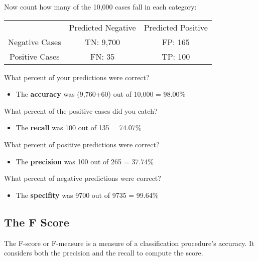 \documentclass[a4paper,12pt]{article}
\begin{document}
Now count how many of the 10,000 cases fall in each category:
\begin{center}
\begin{tabular}{|c|c|c|}
  \hline
&Predicted Negative & Predicted Positive\\
Negative Cases & TN: 9,700 & FP: 165 \\
Positive Cases & FN: 35 & TP: 100 \\

  \hline
\end{tabular}
\end{center}


What percent of your predictions were correct?

\begin{itemize}
\item The \textbf{accuracy} was (9,760+60) out of 10,000 = 98.00\%
\end{itemize}

What percent of the positive cases did you catch?

\begin{itemize}
\item The \textbf{recall} was 100 out of 135 = 74.07\%
\end{itemize}

What percent of positive predictions were correct?

\begin{itemize}
\item The \textbf{precision} was 100 out of 265 = 37.74\%
\end{itemize}

What percent of negative predictions were correct?

\begin{itemize}
\item The \textbf{specifity} was 9700 out of 9735 = 99.64\%
\end{itemize}

\subsection{The F Score}

The F-score or F-measure is a measure of a classification procedure's accuracy.
It considers both the precision  and the recall to compute the score.
\end{document}
